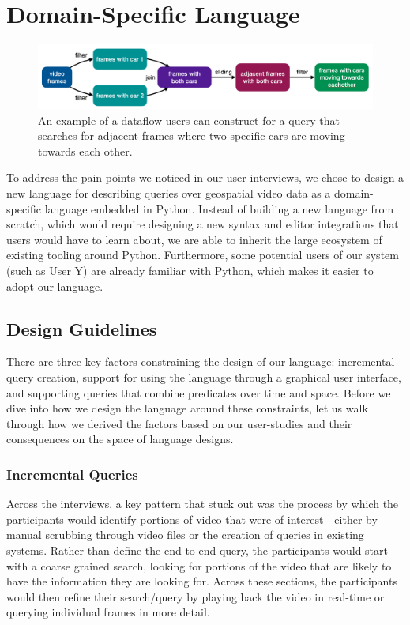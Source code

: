 
\section{Domain-Specific Language}
\begin{figure}[t]
    \centering
    \includegraphics[width=\textwidth]{figures/declarative-dataflow.png}
    \caption{An example of a dataflow users can construct for a query that searches for adjacent frames where two specific cars are moving towards each other.}
    \label{fig:declarative_dataflow}
\end{figure}

To address the pain points we noticed in our user interviews, we chose to design a new language for describing queries over geospatial video data as a domain-specific language embedded in Python. Instead of building a new language from scratch, which would require designing a new syntax and editor integrations that users would have to learn about, we are able to inherit the large ecosystem of existing tooling around Python. Furthermore, some potential users of our system (such as User Y) are already familiar with Python, which makes it easier to adopt our language.

\subsection{Design Guidelines}
There are three key factors constraining the design of our language: incremental query creation, support for using the language through a graphical user interface, and supporting queries that combine predicates over time and space. Before we dive into how we design the language around these constraints, let us walk through how we derived the factors based on our user-studies and their consequences on the space of language designs.

\subsubsection{Incremental Queries}
Across the interviews, a key pattern that stuck out was the process by which the participants would identify portions of video that were of interest---either by manual scrubbing through video files or the creation of queries in existing systems. Rather than define the end-to-end query, the participants would start with a coarse grained search, looking for portions of the video that are likely to have the information they are looking for. Across these sections, the participants would then refine their search/query by playing back the video in real-time or querying individual frames in more detail.

